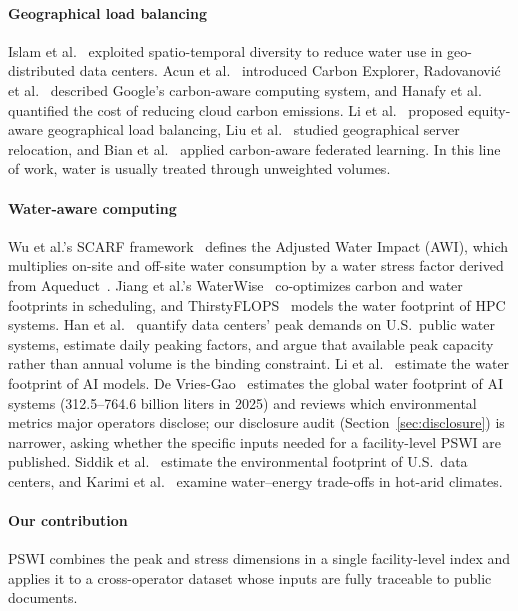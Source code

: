 \documentclass[conference,10pt]{IEEEtran}
\begin{document}
\paragraph{Geographical load balancing}
Islam et al.~\cite{islam2018water} exploited spatio-temporal diversity to
reduce water use in geo-distributed data centers. Acun et
al.~\cite{acun2023carbon} introduced Carbon Explorer, Radovanovi\'{c} et
al.~\cite{radovanovic2023carbon} described Google's carbon-aware computing
system, and Hanafy et al.~\cite{hanafy2024going} quantified the cost of
reducing cloud carbon emissions. Li et al.~\cite{li2024equitable} proposed
equity-aware geographical load balancing, Liu et al.~\cite{liu2024gsr}
studied geographical server relocation, and Bian et
al.~\cite{bian2024cafe} applied carbon-aware federated learning. In this
line of work, water is usually treated through unweighted volumes.

\paragraph{Water-aware computing}
Wu et al.'s SCARF framework~\cite{wu2025scarf} defines the Adjusted Water
Impact (AWI), which multiplies on-site and off-site water consumption by a
water stress factor derived from Aqueduct~\cite{kuzma2023aqueduct}. Jiang et
al.'s WaterWise~\cite{jiang2025waterwise} co-optimizes carbon and water
footprints in scheduling, and ThirstyFLOPS~\cite{jiang2025thirsty} models
the water footprint of HPC systems. Han et al.~\cite{han2026} quantify data
centers' peak demands on U.S.\ public water systems, estimate daily peaking
factors, and argue that available peak capacity rather than annual volume is
the binding constraint. Li et al.~\cite{li2023thirsty} estimate the water
footprint of AI models. De Vries-Gao~\cite{devries2026} estimates the global
water footprint of AI systems (312.5--764.6 billion liters in 2025) and
reviews which environmental metrics major operators disclose; our disclosure
audit (Section~\ref{sec:disclosure}) is narrower, asking whether the
specific inputs needed for a facility-level PSWI are published. Siddik et
al.~\cite{siddik2021environmental} estimate the environmental footprint of
U.S.\ data centers, and Karimi et al.~\cite{karimi2022water} examine
water--energy trade-offs in hot-arid climates.

\paragraph{Our contribution}
PSWI combines the peak and stress dimensions in a single facility-level
index and applies it to a cross-operator dataset whose inputs are fully
traceable to public documents.
\end{document}

